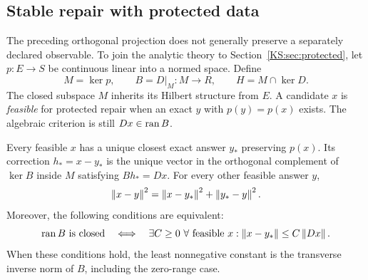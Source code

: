 \subsection{Stable repair with protected data}
The preceding orthogonal projection does not generally preserve a separately declared observable. To join the analytic theory to Section~\ref{KS:sec:protected}, let \(p:E\to S\) be continuous linear into a normed space. Define
\[
 M=\ker p,\qquad B=D|_M:M\to R,\qquad H=M\cap\ker D.
\]
The closed subspace \(M\) inherits its Hilbert structure from \(E\). A candidate \(x\) is \emph{feasible} for protected repair when an exact \(y\) with \(p(y)=p(x)\) exists. The algebraic criterion is still \(Dx\in\operatorname{ran} B\).

\begin{KStheorem}\label{KS:KS56}
Every feasible \(x\) has a unique closest exact answer \(y_*\) preserving \(p(x)\). Its correction \(h_*=x-y_*\) is the unique vector in the orthogonal complement of \(\ker B\) inside \(M\) satisfying \(Bh_*=Dx\). For every other feasible answer \(y\),
\[
 \left\lVert x-y\right\rVert^2=\left\lVert x-y_*\right\rVert^2+\left\lVert y_*-y\right\rVert^2.
\]
Moreover, the following conditions are equivalent:
\[
 \operatorname{ran} B\text{ is closed}
 \quad\Longleftrightarrow\quad
 \exists C\ge0\ \forall\text{ feasible }x:
 \left\lVert x-y_*\right\rVert\le C\left\lVert Dx\right\rVert.
\]
When these conditions hold, the least nonnegative constant is the transverse inverse norm of \(B\), including the zero-range case.
\end{KStheorem}
